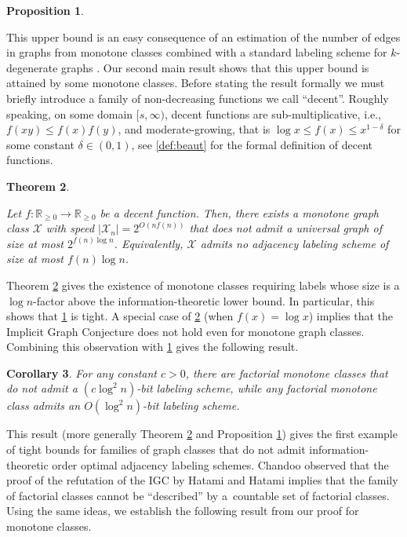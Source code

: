 \documentclass[letterpaper,11pt]{article}
\newcommand{\dec}{decent\xspace}
\newcommand{\Rrr}{\mathbb{R}_{\geq 0}}
\newcommand{\Xc}{\mathcal{X}}
\newtheorem{theorem}{Theorem}[section]
\newtheorem{proposition}[theorem]{Proposition}
\newtheorem{corollary}[theorem]{Corollary}
\theoremstyle{definition}
\theoremstyle{remark}
\renewcommand{\leq}{\leqslant}
\renewcommand{\geq}{\geqslant}
\begin{document}
\begin{proposition}\label{lem:monotone-factorial}
	\monofactorial
\end{proposition}

This upper bound is an easy consequence of an estimation of the number of edges in graphs from monotone classes combined with a standard labeling scheme for $k$-degenerate graphs \cite{KNR88}. 
 Our second main result shows that this upper bound is attained by some monotone classes.
 Before stating the result formally we must briefly introduce a family of non-decreasing functions we call ``decent''.  Roughly speaking, on some domain $[s,\infty)$, decent  functions are sub-multiplicative, i.e.,\ $f(xy) \leq f(x)f(y)$, and moderate-growing, that is $\log x \leq f(x) \leq x^{1-\delta}$ for some constant $\delta\in(0,1)$, see \cref{def:beaut} for the formal definition of decent functions.
 
 
 \def\lowerbound{
 	Let $f : \Rrr \rightarrow \Rrr$ be a \dec function. 
 	Then, there exists a monotone graph class $\mathcal{X}$ with speed $|\Xc_n| = 2^{O(nf(n))}$ 
 	that does not admit a universal graph of size at most $2^{f(n) \log n}$. 
 	Equivalently, $\Xc$ admits no adjacency labeling scheme of size at most $ f(n) \log n$.}
 \begin{theorem}\label{th:main}
 	\lowerbound
 \end{theorem}
 

 
 	Theorem \ref{th:main} gives the existence of monotone classes requiring labels whose size is a $\log n$-factor above the information-theoretic lower bound. In particular, this shows that \cref{lem:monotone-factorial} is tight. 
A special case of \cref{th:main} (when $f(x) = \log x$) implies that the Implicit Graph Conjecture does not hold even for monotone graph classes. Combining this observation with \cref{lem:monotone-factorial} gives the following result. 

\begin{corollary}\label{cor:factorial}
	For any constant $c>0$, there are factorial monotone classes that do not admit a $(c \log^2 n)$-bit labeling scheme, while any factorial monotone class admits an $O(\log^2 n)$-bit labeling scheme. 
\end{corollary}

This result (more generally Theorem \ref{th:main} and Proposition \ref{lem:monotone-factorial}) gives the first example of tight bounds for families of graph classes that do not admit information-theoretic order optimal adjacency labeling schemes.
Chandoo \cite{Chandoo23} observed that the proof of the refutation of the IGC by Hatami and Hatami \cite{HH22} implies that the family of factorial classes cannot be ``described'' by a~countable set of factorial classes. Using the same ideas, we establish the following result from our proof for monotone classes.  
\end{document}
